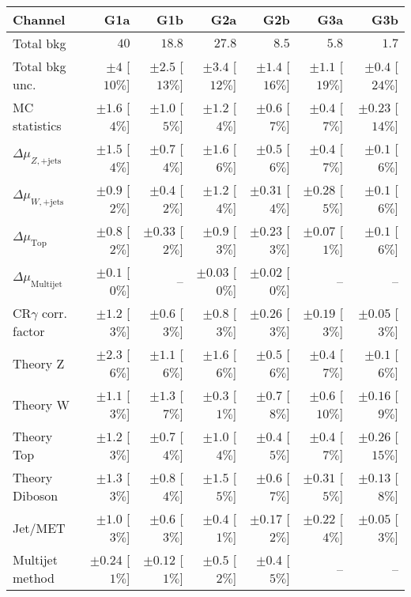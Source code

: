 \begin{table}[tbp]
\begin{center}
\begin{tabular}{|lrrrrrr|}
\hline
Channel  &  \textbf{ G1a } & \textbf{ G1b } & \textbf{ G2a } & \textbf{ G2b } & \textbf{ G3a } & \textbf{ G3b }  \\ \hline
Total bkg  &  $40$  &  $18.8$  &  $27.8$  &  $8.5$  &  $5.8$  &  $1.7$ \\
Total bkg unc.  &  $\pm 4$  [$10\%$]  &  $\pm 2.5$  [$13\%$]  &  $\pm 3.4$  [$12\%$]  &  $\pm 1.4$  [$16\%$]  &  $\pm 1.1$  [$19\%$]  &  $\pm 0.4$  [$24\%$] \\
\hline
MC statistics  &  $\pm 1.6$ [$4\%$]  &  $\pm 1.0$ [$5\%$]  &  $\pm 1.2$ [$4\%$]  &  $\pm 0.6$ [$7\%$]  &  $\pm 0.4$ [$7\%$]  &  $\pm 0.23$ [$14\%$] \\
$\Delta\mu_{Z,\mathrm{+jets}}$  &  $\pm 1.5$ [$4\%$]  &  $\pm 0.7$ [$4\%$]  &  $\pm 1.6$ [$6\%$]  &  $\pm 0.5$ [$6\%$]  &  $\pm 0.4$ [$7\%$]  &  $\pm 0.1$ [$6\%$] \\
$\Delta\mu_{W,\mathrm{+jets}}$  &  $\pm 0.9$ [$2\%$]  &  $\pm 0.4$ [$2\%$]  &  $\pm 1.2$ [$4\%$]  &  $\pm 0.31$ [$4\%$]  &  $\pm 0.28$ [$5\%$]  &  $\pm 0.1$ [$6\%$] \\
$\Delta\mu_{\mathrm{ Top}}$  &  $\pm 0.8$ [$2\%$]  &  $\pm 0.33$ [$2\%$]  &  $\pm 0.9$ [$3\%$]  &  $\pm 0.23$ [$3\%$]  &  $\pm 0.07$ [$1\%$]  &  $\pm 0.1$ [$6\%$] \\
$\Delta\mu_{\mathrm{ Multijet}}$  &  $\pm 0.1$ [$0\%$]  &  --  &  $\pm 0.03$ [$0\%$]  &  $\pm 0.02$ [$0\%$]  &   --    &   --   \\
CR$\gamma$ corr. factor  &  $\pm 1.2$ [$3\%$]  &  $\pm 0.6$ [$3\%$]  &  $\pm 0.8$ [$3\%$]  &  $\pm 0.26$ [$3\%$]  &  $\pm 0.19$ [$3\%$]  &  $\pm 0.05$ [$3\%$] \\
Theory Z  &  $\pm 2.3$ [$6\%$]  &  $\pm 1.1$ [$6\%$]  &  $\pm 1.6$ [$6\%$]  &  $\pm 0.5$ [$6\%$]  &  $\pm 0.4$ [$7\%$]  &  $\pm 0.1$ [$6\%$] \\
Theory W  &  $\pm 1.1$ [$3\%$]  &  $\pm 1.3$ [$7\%$]  &  $\pm 0.3$ [$1\%$]  &  $\pm 0.7$ [$8\%$]  &  $\pm 0.6$ [$10\%$]  &  $\pm 0.16$ [$9\%$] \\
Theory Top   &  $\pm 1.2$ [$3\%$]  &  $\pm 0.7$ [$4\%$]  &  $\pm 1.0$ [$4\%$]  &  $\pm 0.4$ [$5\%$]  &  $\pm 0.4$ [$7\%$]  &  $\pm 0.26$ [$15\%$] \\
Theory Diboson  &  $\pm 1.3$ [$3\%$]  &  $\pm 0.8$ [$4\%$]  &  $\pm 1.5$ [$5\%$]  &  $\pm 0.6$ [$7\%$]  &  $\pm 0.31$ [$5\%$]  &  $\pm 0.13$ [$8\%$] \\
Jet/MET   &  $\pm 1.0$ [$3\%$]  &  $\pm 0.6$ [$3\%$]  &  $\pm 0.4$ [$1\%$]  &  $\pm 0.17$ [$2\%$]  &  $\pm 0.22$ [$4\%$]  &  $\pm 0.05$ [$3\%$] \\
Multijet method  &  $\pm 0.24$ [$1\%$]  &  $\pm 0.12$ [$1\%$]  &  $\pm 0.5$ [$2\%$]  &  $\pm 0.4$ [$5\%$]  &   --    &   --   \\
\hline
\end{tabular}


\end{center}
\end{table}
